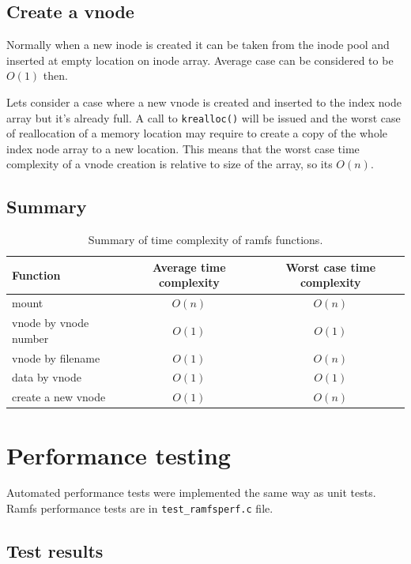 \subsection{Create a vnode}

Normally when a new inode is created it can be taken from the inode pool and
inserted at empty location on inode array. Average case can be considered to be
$O(1)$ then.

Lets consider a case where a new vnode is created and inserted to the index node
array but it's already full. A call to \verb+krealloc()+ will be issued and the
worst case of reallocation of a memory location may require to create a copy
of the whole index node array to a new location. This means that the worst case
time complexity of a vnode creation is relative to size of the array, so its
$O(n)$.

\subsection{Summary}

\begin{table}
  \caption{Summary of time complexity of ramfs functions.}
  \label{table:complexity}
  \begin{tabular}{lcc}
    Function & Average time complexity & Worst case time complexity \\
    \hline
    mount                 & $O(n)$ & $O(n)$ \\
    vnode by vnode number & $O(1)$ & $O(1)$ \\
    vnode by filename     & $O(1)$ & $O(n)$ \\
    data by vnode         & $O(1)$ & $O(1)$ \\
    create a new vnode    & $O(1)$ & $O(n)$
  \end{tabular}
\end{table}


\section{Performance testing}

Automated performance tests were implemented the same way as unit tests.
Ramfs performance tests are in \verb+test_ramfsperf.c+ file.

\subsection{Test results}

